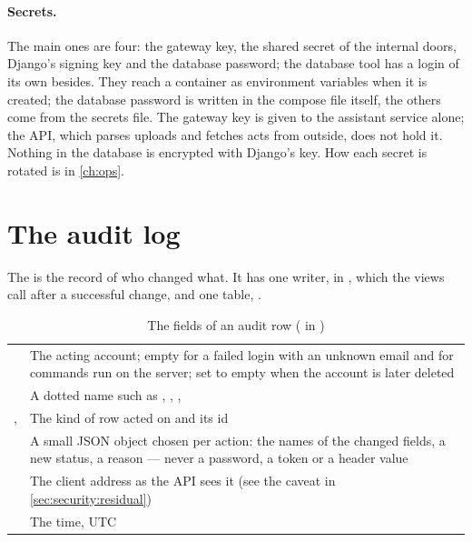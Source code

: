 \paragraph{Secrets.} The main ones are four: the gateway key, the shared secret of the
internal doors, Django's signing key and the database password; the database tool has a
login of its own besides. They reach a container as environment variables when it is
created; the database password is written in the compose file itself, the others come from
the secrets file. The gateway key is given to the assistant service
alone; the API, which parses uploads and fetches acts from outside, does not hold it. Nothing
in the database is encrypted with Django's key. How each secret is rotated is in
\cref{ch:ops}.


\section{The audit log}\label{sec:security:audit}

The  is the record of who changed what. It has one writer,  in
, which the views call after a successful change, and one table,
.

\begin{table}[H]
\caption{The fields of an audit row ( in )}\label{tab:security:audit}
\begin{tabularx}{\textwidth}{@{}L{30mm}Y@{}}
\toprule
{} &  \\
\midrule
{} & The acting account; empty for a failed login with an unknown email and for commands run on the server; set to empty when the account is later deleted \\
 & A dotted name such as , , ,  \\
,  & The kind of row acted on and its id \\
 & A small JSON object chosen per action: the names of the changed fields, a new status, a reason --- never a password, a token or a header value \\
 & The client address as the API sees it (see the caveat in \cref{sec:security:residual}) \\
 & The time, UTC \\
\bottomrule
\end{tabularx}
\end{table}

